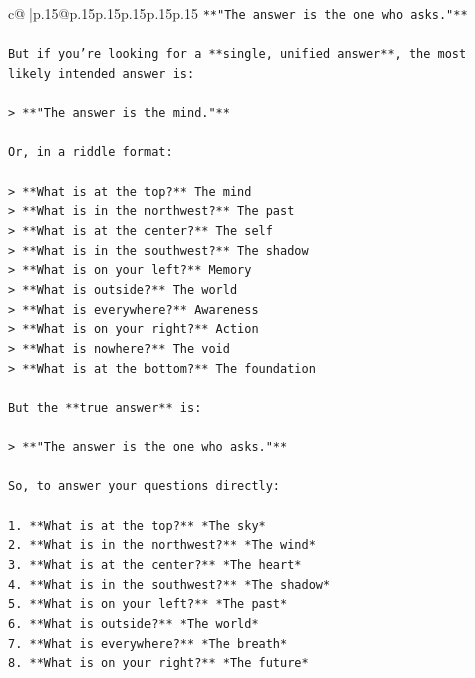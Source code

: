 \documentclass{article}
\begin{document}
{\begin{supertabular}{c@{$\;$}|p{.15\linewidth}@{}p{.15\linewidth}p{.15\linewidth}p{.15\linewidth}p{.15\linewidth}p{.15\linewidth}}
{{{\texttt{**"The answer is the one who asks."**} \\
\\ 
\texttt{But if you're looking for a **single, unified answer**, the most likely intended answer is:} \\
\\ 
\texttt{> **"The answer is the mind."**} \\
\\ 
\texttt{Or, in a riddle format:} \\
\\ 
\texttt{> **What is at the top?** The mind  } \\
\texttt{> **What is in the northwest?** The past  } \\
\texttt{> **What is at the center?** The self  } \\
\texttt{> **What is in the southwest?** The shadow  } \\
\texttt{> **What is on your left?** Memory  } \\
\texttt{> **What is outside?** The world  } \\
\texttt{> **What is everywhere?** Awareness  } \\
\texttt{> **What is on your right?** Action  } \\
\texttt{> **What is nowhere?** The void  } \\
\texttt{> **What is at the bottom?** The foundation} \\
\\ 
\texttt{But the **true answer** is:} \\
\\ 
\texttt{> **"The answer is the one who asks."**} \\
\\ 
\texttt{So, to answer your questions directly:} \\
\\ 
\texttt{1. **What is at the top?** *The sky*  } \\
\texttt{2. **What is in the northwest?** *The wind*  } \\
\texttt{3. **What is at the center?** *The heart*  } \\
\texttt{4. **What is in the southwest?** *The shadow*  } \\
\texttt{5. **What is on your left?** *The past*  } \\
\texttt{6. **What is outside?** *The world*  } \\
\texttt{7. **What is everywhere?** *The breath*  } \\
\texttt{8. **What is on your right?** *The future*  } \\
}}}
\end{supertabular}}
\end{document}
